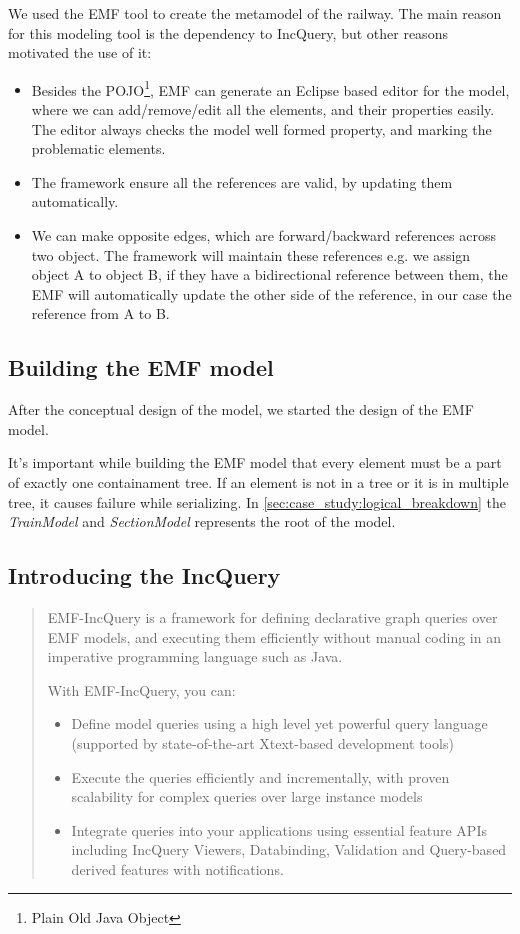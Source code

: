We used the EMF tool to create the metamodel of the railway. The main reason for this modeling tool is the dependency to IncQuery, but other reasons motivated the use of it:
\begin{itemize}
	\item Besides the POJO\footnote{Plain Old Java Object}, EMF can generate an Eclipse based editor for the model, where we can add/remove/edit all the elements, and their properties easily. The editor always checks the model well formed property, and marking the problematic elements.
	\item The framework ensure all the references are valid, by updating them automatically.
	\item We can make opposite edges, which are forward/backward references across two object. The framework will maintain these references e.g. we assign object A to object B, if they have a bidirectional reference between them, the EMF will automatically update the other side of the reference, in our case the reference from A to B.
\end{itemize}

\subsection{Building the EMF model}

After the conceptual design of the model, we started the design of the EMF model.

It's important while building the EMF model that every element must be a part of exactly one containament tree. If an element is not in a tree or it is in multiple tree, it causes failure while serializing. In \cref{sec:case_study:logical_breakdown} the \emph{TrainModel} and \emph{SectionModel} represents the root of the model.

\subsection{Introducing the IncQuery}

\begin{quotation}
	EMF-IncQuery is a framework for defining declarative graph queries over EMF models, and executing them efficiently without manual coding in an imperative programming language such as Java.

	With EMF-IncQuery, you can:
	\begin{itemize}
		\item Define model queries using a high level yet powerful query language (supported by state-of-the-art Xtext-based development tools)
		\item Execute the queries efficiently and incrementally, with proven scalability for complex queries over large instance models
		\item Integrate queries into your applications using essential feature APIs including IncQuery Viewers, Databinding, Validation and Query-based derived features with notifications.
	\end{itemize}
\end{quotation}

